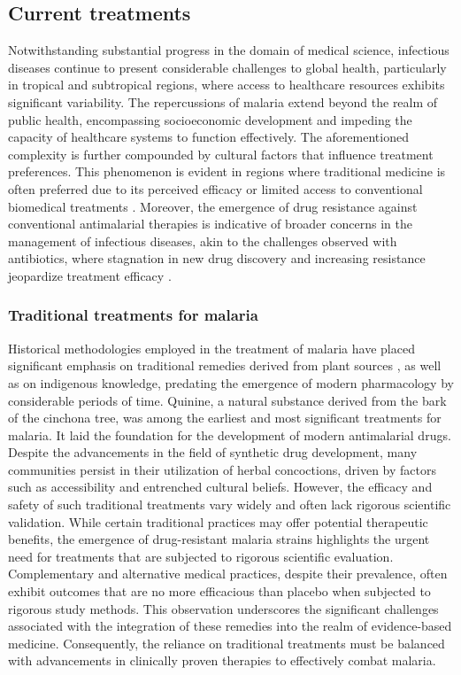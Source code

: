 \subsection{Current treatments}
Notwithstanding substantial progress in the domain of medical science, infectious diseases continue to present considerable challenges to global health, particularly in tropical and subtropical regions, where access to healthcare resources exhibits significant variability. The repercussions of malaria extend beyond the realm of public health, encompassing socioeconomic development and impeding the capacity of healthcare systems to function effectively. The aforementioned complexity is further compounded by cultural factors that influence treatment preferences. This phenomenon is evident in regions where traditional medicine is often preferred due to its perceived efficacy or limited access to conventional biomedical treatments \cite{Gyasi2016}. Moreover, the emergence of drug resistance against conventional antimalarial therapies is indicative of broader concerns in the management of infectious diseases, akin to the challenges observed with antibiotics, where stagnation in new drug discovery and increasing resistance jeopardize treatment efficacy \cite{Barmpouni2022}. 

\subsubsection{Traditional treatments for malaria}
Historical methodologies employed in the treatment of malaria have placed significant emphasis on traditional remedies derived from plant sources \cite{Newman2007}, as well as on indigenous knowledge, predating the emergence of modern pharmacology by considerable periods of time. Quinine, a natural substance derived from the bark of the cinchona tree, was among the earliest and most significant treatments for malaria. It laid the foundation for the development of modern antimalarial drugs. Despite the advancements in the field of synthetic drug development, many communities persist in their utilization of herbal concoctions, driven by factors such as accessibility and entrenched cultural beliefs. However, the efficacy and safety of such traditional treatments vary widely and often lack rigorous scientific validation. While certain traditional practices may offer potential therapeutic benefits, the emergence of drug-resistant malaria strains highlights the urgent need for treatments that are subjected to rigorous scientific evaluation. Complementary and alternative medical practices, despite their prevalence, often exhibit outcomes that are no more efficacious than placebo when subjected to rigorous study methods. This observation underscores the significant challenges associated with the integration of these remedies into the realm of evidence-based medicine. Consequently, the reliance on traditional treatments must be balanced with advancements in clinically proven therapies to effectively combat malaria.


